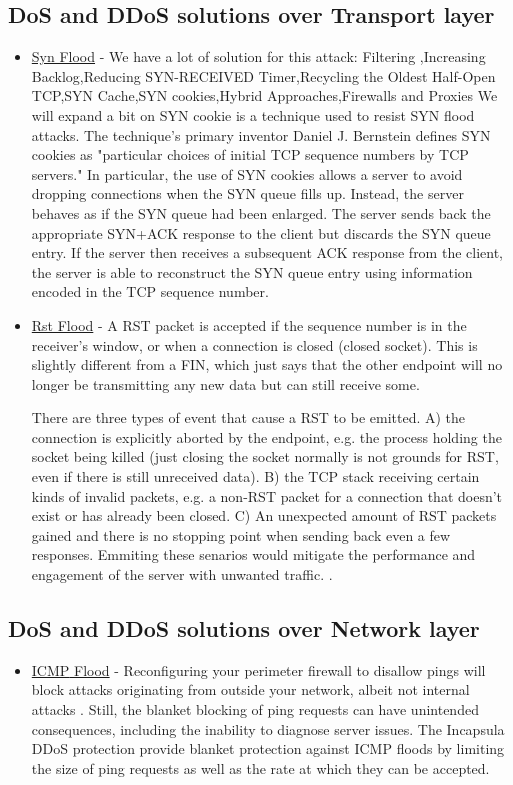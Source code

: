 \documentclass{report}
\begin{document}
\subsection {DoS and DDoS solutions over Transport layer} 
\begin{itemize}
\item\underline{Syn Flood} - We have a lot of solution \cite{SynSolution} for this attack:
Filtering ,Increasing Backlog,Reducing SYN-RECEIVED Timer,Recycling the Oldest Half-Open \gls{TCP},SYN Cache,SYN cookies,Hybrid Approaches,Firewalls and Proxies
We will expand a bit on SYN cookie is a technique used to resist SYN flood attacks. The technique's primary inventor Daniel J. Bernstein defines SYN cookies as "particular choices of initial \gls{TCP} sequence numbers by \gls{TCP} servers." In particular, the use of SYN cookies allows a server to avoid dropping connections when the SYN queue fills up. Instead, the server behaves as if the SYN queue had been enlarged. The server sends back the appropriate SYN+ACK response to the client but discards the SYN queue entry. If the server then receives a subsequent ACK response from the client, the server is able to reconstruct the SYN queue entry using information encoded in the \gls{TCP} sequence number.

\item\underline {Rst Flood} - A RST packet is accepted if the sequence number is in the receiver's window, or when a connection is closed (closed socket). This is slightly different from a FIN, which just says that the other endpoint will no longer be transmitting any new data but can still receive some.

There are three types of event that cause a RST to be emitted. A) the connection is explicitly aborted by the endpoint, e.g. the process holding the socket being killed (just closing the socket normally is not grounds for RST, even if there is still unreceived data). B) the \gls{TCP} stack receiving certain kinds of invalid packets, e.g. a non-RST packet for a connection that doesn't exist or has already been closed. C) An unexpected amount of RST packets gained and there is no stopping point when sending back even a few responses.
Emmiting these senarios would mitigate the performance and engagement of the server with unwanted traffic. \cite{RstSolution}.
\end{itemize}

\subsection {DoS and DDoS solutions over Network layer} 
\begin{itemize}
\item\underline {\gls{ICMP} Flood} - Reconfiguring your perimeter firewall to disallow pings will block attacks originating from outside your network, albeit not internal attacks \cite{ICMPSolution}. Still, the blanket blocking of ping requests can have unintended consequences, including the inability to diagnose server issues.
The Incapsula \gls{DDoS} protection provide blanket protection against \gls{ICMP} floods by limiting the size of ping requests as well as the rate at which they can be accepted.
\end{itemize}
 \hfill \break
\end{document}
